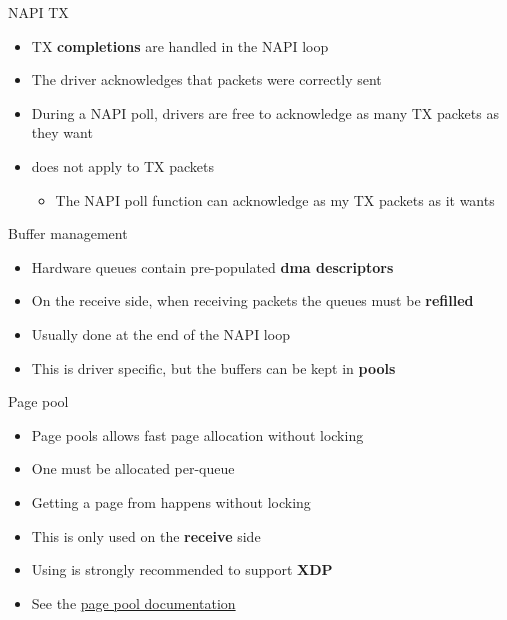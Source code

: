 \begin{frame}{NAPI TX}
	\begin{itemize}
		\item TX \textbf{completions} are handled in the NAPI loop
		\item The driver acknowledges that packets were correctly sent
		\item During a NAPI poll, drivers are free to acknowledge as many TX packets as they want
		\item {} does not apply to TX packets
			\begin{itemize}
				\item The NAPI poll function can acknowledge as my TX packets as it wants
			\end{itemize}
	\end{itemize}
\end{frame}

\begin{frame}{Buffer management}
	\begin{itemize}
		\item Hardware queues contain pre-populated \textbf{dma descriptors}
		\item On the receive side, when receiving packets the queues must be \textbf{refilled}
		\item Usually done at the end of the NAPI loop
		\item This is driver specific, but the buffers can be kept in \textbf{pools}
	\end{itemize}
\end{frame}

\begin{frame}{Page pool}
	\begin{itemize}
		\item Page pools allows fast page allocation without locking
		\item One  must be allocated per-queue
		\item Getting a page from  happens without locking
		\item This is only used on the \textbf{receive} side
		\item Using  is strongly recommended to support \textbf{XDP}
		\item See the \href{https://docs.kernel.org/networking/page_pool.html}{page pool documentation}
	\end{itemize}
\end{frame}


